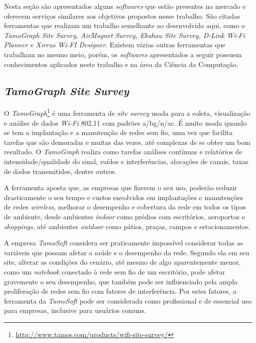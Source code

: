 \documentclass[
	12pt,				%
	twoside,			%
	a4paper,			%
	english,			%
	french,				%
	spanish,			%
	brazil				%
	]{abntex2}
\begin{document}
Nesta seção são apresentados alguns \emph{softwares} que estão presentes
no mercado e oferecem serviços similares aos objetivos propostos nesse
trabalho. São citadas ferramentas que realizam um trabalho semelhante ao
desenvolvido aqui, como o \emph{TamoGraph Site Survey, AirMagnet Survey,
Ekahau Site Survey, D-Link Wi-Fi Planner e Xirrus Wi-FI Designer}.
Existem várias outras ferramentas que trabalham no mesmo meio, porém, os
\emph{softwares} apresentados a seguir possuem conhecimentos aplicados
neste trabalho e na área da Ciência da Computação.

\subsection{\texorpdfstring{\emph{TamoGraph Site
Survey}}{TamoGraph Site Survey}}\label{tamograph-site-survey}

O \emph{TamoGraph}\footnote{\url{http://www.tamos.com/products/wifi-site-survey/}}
é uma ferramenta de \emph{site survey} usada para a coleta, visualização
e análise de dados \emph{Wi-Fi} 802.11 com padrões a/bg/n/ac. É muito
usada quando se tem a implantação e a manutenção de redes sem fio, uma
vez que facilita tarefas que são demoradas e muitas das vezes, até
complexas de se obter um bom resultado. O \emph{TamoGraph} realiza como
tarefas análises contínuas e relatórios de intensidade/qualidade do
sinal, ruídos e interferências, alocações de canais, taxas de dados
transmitidos, dentre outros.

A ferramenta aposta que, as empresas que fizerem o seu uso, poderão
reduzir drasticamente o seu tempo e custos envolvidos em implantações e
manutenções de redes \emph{wireless}, melhorar o desempenho e cobertura
da rede em todos os tipos de ambiente, desde ambientes \emph{indoor}
como prédios com escritórios, aeroportos e \emph{shoppings}, até
ambientes \emph{outdoor} como pátios, praças, campos e estacionamentos.

A empresa \emph{TamoSoft} considera ser praticamente impossível
considerar todas as variáveis que possam afetar a saúde e o desempenho
da rede. Segundo ela em seu site, alterar as condições do cenário, até
mesmo de algo aparentemente menor, como um \emph{notebook} conectado à
rede sem fio de um escritório, pode afetar gravemente o seu desempenho,
que também pode ser influenciado pela ampla proliferação de redes sem
fio com fatores de interferência. Por estes fatores, a ferramenta da
\emph{TamoSoft} pode ser considerada como profissional e de essencial
uso para empresas, inclusive para usuários comuns.
\end{document}

